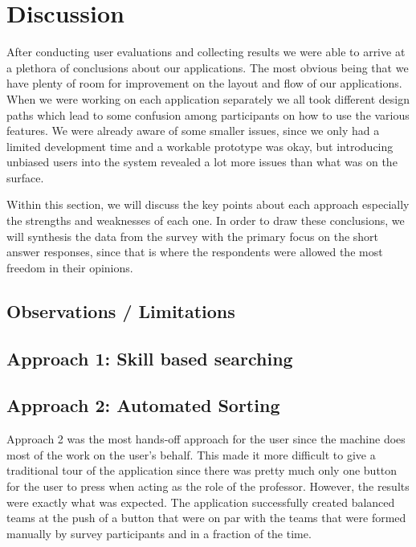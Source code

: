 \documentclass[conference]{IEEEtran}
\begin{document}
\section{Discussion}
After conducting user evaluations and collecting results we were able to arrive at a plethora of conclusions about our applications. The most obvious being that we have plenty of room for improvement on the layout and flow of our applications. When we were working on each application separately we all took different design paths which lead to some confusion among participants on how to use the various features. We were already aware of some smaller issues, since we only had a limited development time and a workable prototype was okay, but introducing unbiased users into the system revealed a lot more issues than what was on the surface. 

Within this section, we will discuss the key points about each approach especially the strengths and weaknesses of each one. In order to draw these conclusions, we will synthesis the data from the survey with the primary focus on the short answer responses, since that is where the respondents were allowed the most freedom in their opinions. 

\subsection{Observations / Limitations}

\subsection{Approach 1: Skill based searching}

\subsection{Approach 2: Automated Sorting}
Approach 2 was the most hands-off approach for the user since the machine does most of the work on the user's behalf. This made it more difficult to give a traditional tour of the application since there was pretty much only one button for the user to press when acting as the role of the professor. However, the results were exactly what was expected. The application successfully created balanced teams at the push of a button that were on par with the teams that were formed manually by survey participants and in a fraction of the time. 
\end{document}
